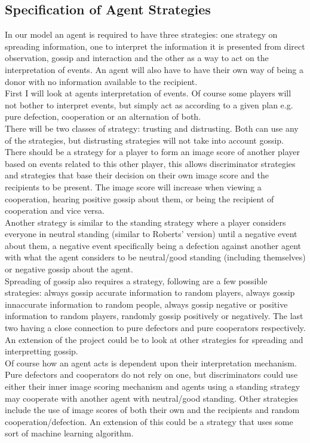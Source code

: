 \documentclass[twoside,twocolumn]{article}
\begin{document}
\subsection{Specification of Agent Strategies}
In our model an agent is required to have three strategies: one strategy on spreading information, one to interpret the information it is presented from direct observation, gossip and interaction and the other as a way to act on the interpretation of events. An agent will also have to have their own way of being a donor with no information available to the recipient.\\
First I will look at agents interpretation of events. Of course some players will not bother to interpret events, but simply act as according to a given plan e.g. pure defection, cooperation or an alternation of both. \\
There will be two classes of strategy: trusting and distrusting. Both can use any of the strategies, but distrusting strategies will not take into account gossip.\\
There should be a strategy for a player to form an image score of another player based on events related to this other player, this allows discriminator strategies and strategies that base their decision on their own image score and the recipients to be present. The image score will increase when viewing a cooperation, hearing positive gossip about them, or being the recipient of cooperation and vice versa.\\
Another strategy is similar to the standing strategy where a player considers everyone in neutral standing (similar to Roberts' version) until a negative event about them, a negative event specifically being a defection against another agent with what the agent considers to be neutral/good standing (including themselves) or negative gossip about the agent.\\
Spreading of gossip also requires a strategy, following are a few possible strategies: always gossip accurate information to random players, always gossip innaccurate information to random people, always gossip negative or positive information to random players, randomly gossip positively or negatively. The last two having a close connection to pure defectors and pure cooperators respectively.\\
An extension of the project could be to look at other strategies for spreading and interpretting gossip.\\
Of course how an agent acts is dependent upon their interpretation mechanism. Pure defectors and cooperators do not rely on one, but discriminators could use either their inner image scoring mechanism and agents using a standing strategy may cooperate with another agent with neutral/good standing. Other strategies include the use of image scores of both their own and the recipients and random cooperation/defection. An extension of this could be a strategy that uses some sort of machine learning algorithm.
\end{document}
